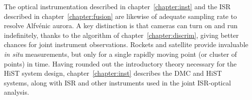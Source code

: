 The optical instrumentation described in chapter~\ref{chapter:inst} and the ISR described in chapter~\ref{chapter:fusion} are likewise of adequate sampling rate to resolve Alfvénic aurora.
A key distinction is that cameras can turn on and run indefinitely, thanks to the algorithm of chapter~\ref{chapter:discrim}, giving better chances for joint instrument observations.
Rockets and satellite provide invaluable \textit{in situ} measurements, but only for a single rapidly moving point (or cluster of points) in time.
Having rounded out the introductory theory necessary for the HiST system design, chapter~\ref{chapter:inst} describes the DMC and HiST systems, along with ISR and other instruments used in the joint ISR-optical analysis.
